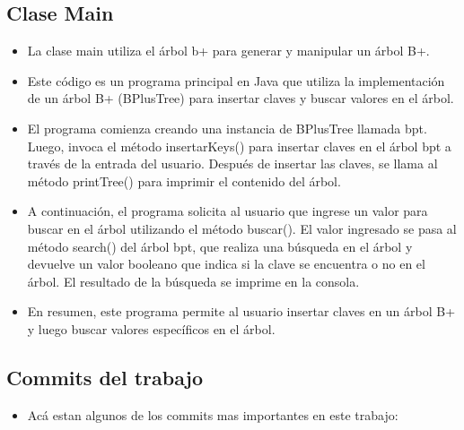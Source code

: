\documentclass{article}
\begin{document}
\subsection{Clase Main}
\begin{itemize}	
	\item La clase main utiliza el árbol b+ para generar y manipular un árbol B+.
\end{itemize}	
	
\begin{itemize}
	\item Este código es un programa principal en Java que utiliza la implementación de un árbol B+ (BPlusTree) para insertar claves y buscar valores en el árbol.

\item El programa comienza creando una instancia de BPlusTree llamada bpt. Luego, invoca el método insertarKeys() para insertar claves en el árbol bpt a través de la entrada del usuario. Después de insertar las claves, se llama al método printTree() para imprimir el contenido del árbol.

\item A continuación, el programa solicita al usuario que ingrese un valor para buscar en el árbol utilizando el método buscar(). El valor ingresado se pasa al método search() del árbol bpt, que realiza una búsqueda en el árbol y devuelve un valor booleano que indica si la clave se encuentra o no en el árbol. El resultado de la búsqueda se imprime en la consola.

\item En resumen, este programa permite al usuario insertar claves en un árbol B+ y luego buscar valores específicos en el árbol.
\end{itemize}






	\subsection{Commits del trabajo}
	\begin{itemize}	
		\item Acá estan algunos de los commits mas importantes en este trabajo:
	\end{itemize}	
	
\end{document}

